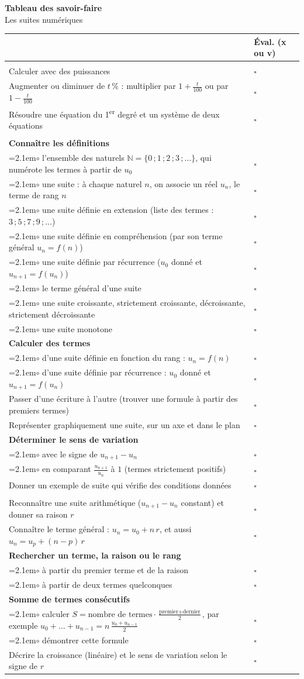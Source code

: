 \documentclass[11pt,a4paper]{article}
\makeatletter
\newcommand{\case}{$\square$}
\newcommand{\sect}[1]{\midrule\multicolumn{2}{@{}l}{\rule{0pt}{4ex}\textbf{\large\color{bleu}#1}}\\[0.6ex]\midrule}
\newcommand{\ligne}[1]{#1 & \case\\}                         %
\newcommand{\groupe}[1]{\rule{0pt}{3.6ex}\textbf{#1} & \\} %
\newcommand{\sous}[1]{\hangindent=2.1em\hangafter=1\hspace{1.2em}$\circ$ #1 & \case\\}  %
\makeatother
\begin{document}
\begin{center}
{\Large\bfseries\color{bleu} Tableau des savoir-faire}\\[1mm]
Les suites numériques
\end{center}
\vspace{-2mm}
\renewcommand{\arraystretch}{1.0}
\begin{longtable}{@{}>{\raggedright\arraybackslash}p{12.6cm}>{\centering\arraybackslash}p{2.9cm}@{}}
\toprule
 & \textbf{Éval. (x ou v)}\\
\endhead
\bottomrule
\endlastfoot

\sect{À revoir avant de commencer}
\ligne{Calculer avec des puissances}
\ligne{Augmenter ou diminuer de $t\,\%$ : multiplier par $1+\frac{t}{100}$ ou par $1-\frac{t}{100}$}
\ligne{Résoudre une équation du 1\textsuperscript{er} degré et un système de deux équations}

\sect{1. Généralités sur les suites}
\groupe{Connaître les définitions}
\sous{l'ensemble des naturels $\mathbb{N}=\{0\,;1\,;2\,;3\,;\ldots\}$, qui numérote les termes à partir de $u_0$}
\sous{une suite : à chaque naturel $n$, on associe un réel $u_n$, le terme de rang $n$}
\sous{une suite définie en extension (liste des termes : $3\,;5\,;7\,;9\,;\ldots$)}
\sous{une suite définie en compréhension (par son terme général $u_n=f(n)$)}
\sous{une suite définie par récurrence ($u_0$ donné et $u_{n+1}=f(u_n)$)}
\sous{le terme général d'une suite}
\sous{une suite croissante, strictement croissante, décroissante, strictement décroissante}
\sous{une suite monotone}
\groupe{Calculer des termes}
\sous{d'une suite définie en fonction du rang : $u_n=f(n)$}
\sous{d'une suite définie par récurrence : $u_0$ donné et $u_{n+1}=f(u_n)$}
\ligne{Passer d'une écriture à l'autre (trouver une formule à partir des premiers termes)}
\ligne{Représenter graphiquement une suite, sur un axe et dans le plan}
\groupe{Déterminer le sens de variation}
\sous{avec le signe de $u_{n+1}-u_n$}
\sous{en comparant $\frac{u_{n+1}}{u_n}$ à $1$ (termes strictement positifs)}
\ligne{Donner un exemple de suite qui vérifie des conditions données}

\sect{2. Suites arithmétiques}
\ligne{Reconnaître une suite arithmétique ($u_{n+1}-u_n$ constant) et donner sa raison $r$}
\ligne{Connaître le terme général : $u_n=u_0+n\,r$, et aussi $u_n=u_p+(n-p)\,r$}
\groupe{Rechercher un terme, la raison ou le rang}
\sous{à partir du premier terme et de la raison}
\sous{à partir de deux termes quelconques}
\groupe{Somme de termes consécutifs}
\sous{calculer $S=\text{nombre de termes}\cdot\frac{\text{premier}+\text{dernier}}{2}$, par exemple $u_0+\ldots+u_{n-1}=n\,\frac{u_0+u_{n-1}}{2}$}
\sous{démontrer cette formule}
\ligne{Décrire la croissance (linéaire) et le sens de variation selon le signe de $r$}


\end{longtable}
\end{document}
